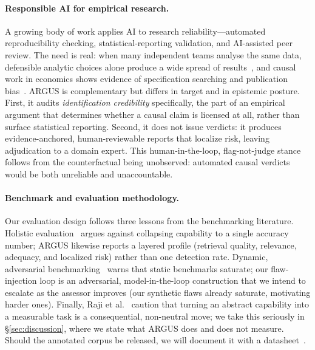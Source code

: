 \paragraph{Responsible AI for empirical research.}
A growing body of work applies AI to research reliability---automated
reproducibility checking, statistical-reporting validation, and AI-assisted peer
review. The need is real: when many independent teams analyse the same data,
defensible analytic choices alone produce a wide spread of
results~\cite{silberzahn2018many,botviniknezer2020variability}, and causal work in
economics shows evidence of specification searching and publication
bias~\cite{brodeur2020methods}. ARGUS is complementary but differs in target and in epistemic posture.
First, it audits \emph{identification credibility} specifically, the part of an
empirical argument that determines whether a causal claim is licensed at all,
rather than surface statistical reporting. Second, it does not
issue verdicts: it produces evidence-anchored, human-reviewable reports that
localize risk, leaving adjudication to a domain expert. This human-in-the-loop,
flag-not-judge stance follows from the counterfactual being unobserved: automated
causal verdicts would be both unreliable and unaccountable.

\paragraph{Benchmark and evaluation methodology.}
Our evaluation design follows three lessons from the benchmarking literature.
Holistic evaluation~\cite{liang2023helm} argues against collapsing capability to a
single accuracy number; ARGUS likewise reports a layered profile (retrieval
quality, relevance, adequacy, and localized risk) rather than one detection rate.
Dynamic, adversarial benchmarking~\cite{kiela2021dynabench} warns that static
benchmarks saturate; our flaw-injection loop is an adversarial, model-in-the-loop
construction that we intend to escalate as the assessor improves (our synthetic
flaws already saturate, motivating harder ones). Finally, Raji et
al.~\cite{raji2021benchmark} caution that turning an abstract capability into a
measurable task is a consequential, non-neutral move; we take this seriously in
\S\ref{sec:discussion}, where we state what ARGUS does and does not
measure. Should the annotated corpus be released, we will document it with a
datasheet~\cite{gebru2021datasheets}.

